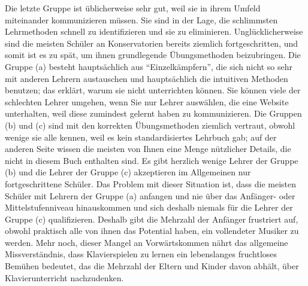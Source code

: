 Die letzte Gruppe ist üblicherweise sehr gut, weil sie in ihrem Umfeld miteinander kommunizieren müssen.
Sie sind in der Lage, die schlimmsten Lehrmethoden schnell zu identifizieren und sie zu eliminieren.
Unglücklicherweise sind die meisten Schüler an Konservatorien bereits ziemlich fortgeschritten, und somit ist es zu spät, um ihnen grundlegende Übungsmethoden beizubringen.
Die Gruppe (a) besteht hauptsächlich aus \enquote{Einzelkämpfern}, die sich nicht so sehr mit anderen Lehrern austauschen und hauptsächlich die intuitiven Methoden benutzen; das erklärt, warum sie nicht unterrichten können.
Sie können viele der schlechten Lehrer umgehen, wenn Sie nur Lehrer auswählen, die eine Website unterhalten, weil diese zumindest gelernt haben zu kommunizieren.
Die Gruppen (b) und (c) sind mit den korrekten Übungsmethoden ziemlich vertraut, obwohl wenige sie alle kennen, weil es kein standardisiertes Lehrbuch gab; auf der anderen Seite wissen die meisten von Ihnen eine Menge nützlicher Details, die nicht in diesem Buch enthalten sind.
Es gibt herzlich wenige Lehrer der Gruppe (b) und die Lehrer der Gruppe (c) akzeptieren im Allgemeinen nur fortgeschrittene Schüler.
Das Problem mit dieser Situation ist, dass die meisten Schüler mit Lehrern der Gruppe (a) anfangen und nie über das Anfänger- oder Mittelstufenniveau hinauskommen und sich deshalb niemals für die Lehrer der Gruppe (c) qualifizieren.
Deshalb gibt die Mehrzahl der Anfänger frustriert auf, obwohl praktisch alle von ihnen das Potential haben, ein vollendeter Musiker zu werden.
Mehr noch, dieser Mangel an Vorwärtskommen nährt das allgemeine Missverständnis, dass Klavierspielen zu lernen ein lebenslanges fruchtloses Bemühen bedeutet, das die Mehrzahl der Eltern und Kinder davon abhält, über Klavierunterricht nachzudenken.

